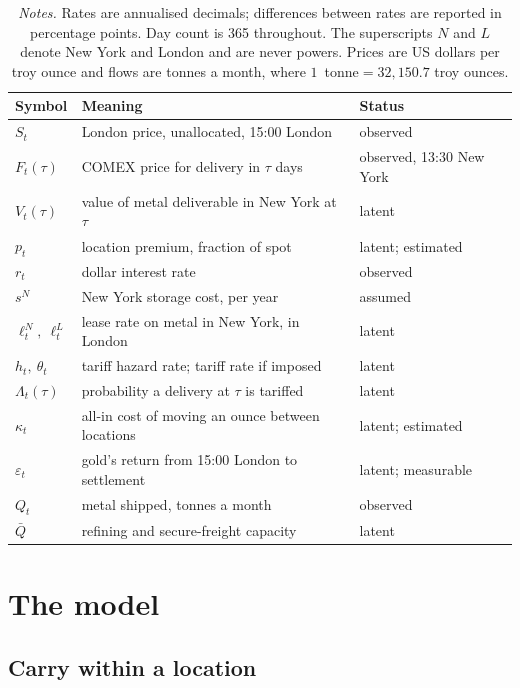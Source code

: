 \documentclass[11pt,a4paper]{article}
\newcommand{\sN}{s^{N}}
\begin{document}
\begin{table}[t]
\centering
\caption{Notation, and the status of each object}
\label{tab:notation}
\small
\begin{tabular}{@{}lll@{}}
\toprule
\textbf{Symbol} & \textbf{Meaning} & \textbf{Status} \\
\midrule
$S_t$ & London price, unallocated, 15:00 London & observed \\
$F_t(\tau)$ & COMEX price for delivery in $\tau$ days & observed, 13:30 New York \\
$V_t(\tau)$ & value of metal deliverable in New York at $\tau$ & latent \\
$p_t$ & location premium, fraction of spot & latent; estimated \\
$r_t$ & dollar interest rate & observed \\
$\sN$ & New York storage cost, per year & assumed \\
$\ell^{N}_{t},\ \ell^{L}_{t}$ & lease rate on metal in New York, in London & latent \\
$h_t,\ \theta_t$ & tariff hazard rate; tariff rate if imposed & latent \\
$\Lambda_t(\tau)$ & probability a delivery at $\tau$ is tariffed & latent \\
$\kappa_t$ & all-in cost of moving an ounce between locations & latent; estimated \\
$\varepsilon_t$ & gold's return from 15:00 London to settlement & latent; measurable \\
$Q_t$ & metal shipped, tonnes a month & observed \\
$\bar{Q}$ & refining and secure-freight capacity & latent \\
\bottomrule
\end{tabular}
\vspace{2pt}
\captionsetup{font=scriptsize}
\caption*{\emph{Notes.} Rates are annualised decimals; differences between
rates are reported in percentage points. Day count is 365 throughout. The
superscripts $N$ and $L$ denote New York and London and are never powers.
Prices are US dollars per troy ounce and flows are tonnes a month, where
$1$~tonne${}=32{,}150.7$ troy ounces.}
\end{table}

\section{The model}
\label{sec:model}

\subsection{Carry within a location}
\end{document}
